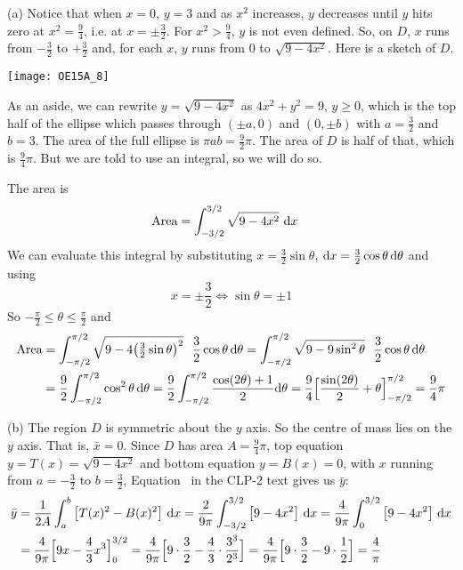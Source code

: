 \begin{solution} (a)
Notice that when $x=0$, $y=3$ and as $x^2$ increases, $y$ decreases
until $y$ hits zero at $x^2=\frac{9}{4}$, i.e. at $x=\pm\frac{3}{2}$.
For $x^2>\frac{9}{4}$, $y$ is not even defined. So, on $D$, $x$ runs from
$-\frac{3}{2}$ to $+\frac{3}{2}$ and, for each $x$, $y$ runs from $0$ to
$\sqrt{9-4x^2}$. Here is a sketch of $D$.

\begin{center}
       \texttt{[image: OE15A\_8]}
\end{center}


As an aside, we can rewrite $y=\sqrt{9-4x^2}$ as $4x^2+y^2=9$,
$y\ge 0$, which is the top half of the ellipse which passes through
$(\pm a,0)$ and $(0,\pm b)$ with $a=\frac{3}{2}$ and $b=3$. The
area of the full ellipse is $\pi ab=\frac{9}{2}\pi$. The area
of $D$ is half of that, which is $\frac{9}{4}\pi$. But we are
told to use an integral, so we will do so.

The area is
\begin{align*}
\text{Area} &= \int_{-3/2}^{3/2} \sqrt{9-4x^2} \ \mathrm{d}x
\end{align*}
We can evaluate this integral by substituting $x=\frac{3}{2}\sin\theta$,
$\mathrm{d}x = \frac{3}{2}\cos\theta\,\mathrm{d}\theta$ and using
\begin{equation*}
x=\pm\frac{3}{2} \iff \sin\theta = \pm 1
\end{equation*}
So $-\frac{\pi}{2}\le\theta\le\frac{\pi}{2}$ and
\begin{alignat*}{3}
\text{Area}
&= \int_{-\pi/2}^{\pi/2}
           \sqrt{9-4\big({\textstyle\frac{3}{2}}\sin\theta\big)^2}
    \ \  \frac{3}{2}\cos\theta\,\mathrm{d}\theta
= \int_{-\pi/2}^{\pi/2}
           \sqrt{9-9\sin^2\theta}
    \ \  \frac{3}{2}\cos\theta\,\mathrm{d}\theta
\\
&=\frac{9}{2}  \int_{-\pi/2}^{\pi/2}\cos^2\theta\,\mathrm{d}\theta
= \frac{9}{2}  \int_{-\pi/2}^{\pi/2}\frac{\cos(2\theta)+1}{2}\mathrm{d}\theta
=\frac{9}{4}\Big[\frac{\sin(2\theta)}{2}+\theta\Big]_{-\pi/2}^{\pi/2}
=\frac{9}{4}\pi
\end{alignat*}

\noindent (b)
The region $D$ is symmetric about the $y$ axis. So the
centre of mass lies on the $y$ axis. That is, $\bar x=0$.
Since $D$ has area $A=\frac{9}{4}\pi$, top equation $y=T(x)=\sqrt{9-4x^2}$
and bottom equation $y=B(x)=0$, with $x$ running from $a=-\frac{3}{2}$
to $b=\frac{3}{2}$,  Equation~ in the CLP-2 text gives us $\bar y$:
\begin{alignat*}{3}
\bar y &=\frac{1}{2A}\int_a^b\big[T(x)^2-B(x)^2\big]\ \mathrm{d}x
=\frac{2}{9\pi}\int_{-3/2}^{3/2}\big[9-4x^2\big]\ \mathrm{d}x
=\frac{4}{9\pi}\int_0^{3/2}\big[9-4x^2\big]\ \mathrm{d}x
\\
&= \frac{4}{9\pi}\Big[9x-\frac{4}{3}x^3\Big]_0^{3/2}
= \frac{4}{9\pi}\Big[9\cdot\frac{3}{2}-\frac{4}{3}\cdot\frac{3^3}{2^3}\Big]
= \frac{4}{9\pi}\Big[9\cdot\frac{3}{2}-9\cdot\frac{1}{2}\Big] = \frac{4}{\pi}
\end{alignat*}

\end{solution}

